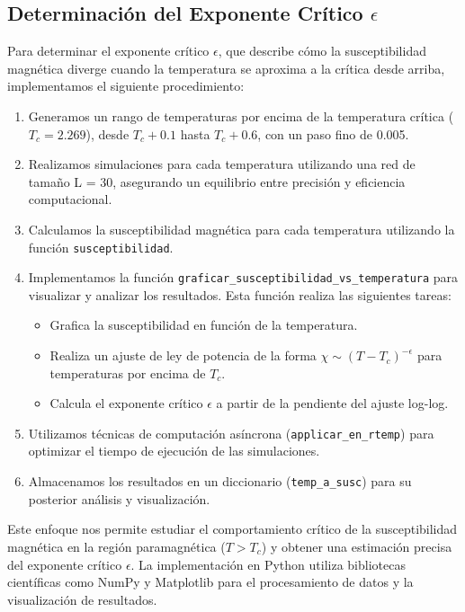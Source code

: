 \documentclass[twocolumn]{article}
\begin{document}
\subsection*{Determinación del Exponente Crítico $\epsilon$}

Para determinar el exponente crítico $\epsilon$, que describe cómo la susceptibilidad magnética diverge cuando la temperatura se aproxima a la crítica desde arriba, implementamos el siguiente procedimiento:

\begin{enumerate}
    \item Generamos un rango de temperaturas por encima de la temperatura crítica ($T_c = 2.269$), desde $T_c + 0.1$ hasta $T_c + 0.6$, con un paso fino de 0.005.
    
    \item Realizamos simulaciones para cada temperatura utilizando una red de tamaño L = 30, asegurando un equilibrio entre precisión y eficiencia computacional.
    
    \item Calculamos la susceptibilidad magnética para cada temperatura utilizando la función \texttt{susceptibilidad}.
    
    \item Implementamos la función \texttt{graficar\_susceptibilidad\_vs\_temperatura} para visualizar y analizar los resultados. Esta función realiza las siguientes tareas:
    \begin{itemize}
        \item Grafica la susceptibilidad en función de la temperatura.
        \item Realiza un ajuste de ley de potencia de la forma $\chi \sim (T - T_c)^{-\epsilon}$ para temperaturas por encima de $T_c$.
        \item Calcula el exponente crítico $\epsilon$ a partir de la pendiente del ajuste log-log.
    \end{itemize}

    \item Utilizamos técnicas de computación asíncrona (\texttt{applicar\_en\_rtemp}) para optimizar el tiempo de ejecución de las simulaciones.
    
    \item Almacenamos los resultados en un diccionario (\texttt{temp\_a\_susc}) para su posterior análisis y visualización.
\end{enumerate}

Este enfoque nos permite estudiar el comportamiento crítico de la susceptibilidad magnética en la región paramagnética ($T > T_c$) y obtener una estimación precisa del exponente crítico $\epsilon$. La implementación en Python utiliza bibliotecas científicas como NumPy y Matplotlib para el procesamiento de datos y la visualización de resultados.
\end{document}

